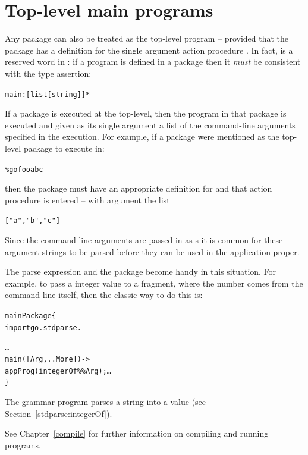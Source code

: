\section{Top-level main programs}
\label{program:top-level}
Any package can also be treated as the top-level program -- provided that the package has a definition for the single argument action procedure . In fact,  is a reserved word in \go: if a  program is defined in a package then it \emph{must} be consistent with the type assertion:
\begin{alltt}
main:[list[string]]*
\end{alltt}

If a package is executed at the top-level, then the  program in that package is executed and given as its single argument a list of the command-line arguments specified in the execution. For example, if a package  were mentioned as the top-level package to execute in:
\begin{alltt}
\% go foo a b c
\end{alltt}
then the package  must have an appropriate definition for  and that action procedure is entered -- with argument the list
\begin{alltt}["a","b","c"]\end{alltt}
\begin{aside}
Since the command line arguments are passed in as s it is common for these argument strings to be parsed before they can be used in the application proper.  

The \q{\%\%} parse expression and the  package become handy in this situation. For example, to pass a integer value to a \go fragment, where the number comes from the command line itself, then the classic way to do this is:
\begin{alltt}
mainPackage\{
  import go.stdparse.
  
  \ldots
  main([Arg,..More]) ->
    appProg(integerOf\%\%Arg);\ldots
\}
\end{alltt}
The  grammar program parses a string into a  value (see Section~\vref{stdparse:integerOf}).

See Chapter~\vref{compile} for further information on compiling and running \go programs.
\end{aside}

